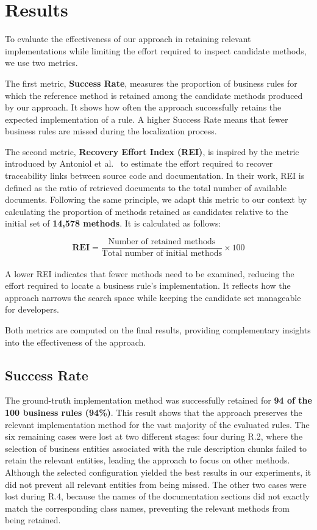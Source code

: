 \section{Results}
\label{sec:results}

To evaluate the effectiveness of our approach in retaining relevant implementations while limiting the effort required to inspect candidate methods, we use two metrics.

The first metric, \textbf{Success Rate}, measures the proportion of business rules for which the reference method is retained among the candidate methods produced by our approach. It shows how often the approach successfully retains the expected implementation of a rule. A higher Success Rate means that fewer business rules are missed during the localization process.

The second metric, \textbf{Recovery Effort Index (REI)}, is inspired by the metric introduced by Antoniol et al.~\cite{Anto02b} to estimate the effort required to recover traceability links between source code and documentation. In their work, REI is defined as the ratio of retrieved documents to the total number of available documents. Following the same principle, we adapt this metric to our context by calculating the proportion of methods retained as candidates relative to the initial set of \textbf{14,578 methods}. It is calculated as follows:

\[
\textbf{REI} = \frac{\text{Number of retained methods}}{\text{Total number of initial methods}} \times 100
\]
\\
A lower REI indicates that fewer methods need to be examined, reducing the effort required to locate a business rule's implementation. It reflects how the approach narrows the search space while keeping the candidate set manageable for developers.

Both metrics are computed on the final results, providing complementary insights into the effectiveness of the approach.

\subsection{Success Rate}

The ground-truth implementation method was successfully retained for \textbf{94 of the 100 business rules (94\%)}. This result shows that the approach preserves the relevant implementation method for the vast majority of the evaluated rules. The six remaining cases were lost at two different stages: four during R.2, where the selection of business entities associated with the rule description chunks failed to retain the relevant entities, leading the approach to focus on other methods. Although the selected configuration yielded the best results in our experiments, it did not prevent all relevant entities from being missed. The other two cases were lost during R.4, because the names of the documentation sections did not exactly match the corresponding class names, preventing the relevant methods from being retained.

